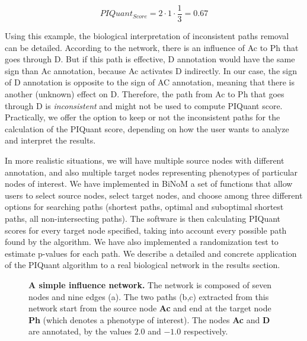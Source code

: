 \documentclass[10pt]{bmc_article}
\newenvironment{bmcformat}{\baselineskip20pt\sloppy\setboolean{publ}{false}}{\baselineskip20pt\sloppy}
\begin{document}
\begin{bmcformat}
$$
 PIQuant_{Score} = 2 \cdot 1 \cdot \frac{1}{3} = 0.67
$$

Using this example, the biological interpretation of inconsistent paths removal
can be detailed. According to the network, there is an influence of Ac to Ph
that goes through D. But if this path
is effective, D annotation would have the same sign than Ac annotation, because
Ac activates D indirectly. In our case, the sign of D annotation is opposite to
the sign of AC annotation, meaning that there is another (unknown) effect on D.
Therefore, the path from Ac to Ph that goes through D is \textit{inconsistent} and
might not be used to compute PIQuant score. Practically, we offer the option to
keep or not the inconsistent paths for the calculation of the PIQuant score,
depending on how the user wants to analyze and interpret the results.

In more realistic situations, we will have multiple source nodes with different
 annotation, and also multiple target nodes representing phenotypes of
particular nodes of interest. We have implemented in BiNoM a set of functions
that allow users to select source nodes, select target nodes, and choose among
three different options for searching paths (shortest paths, optimal and
suboptimal shortest paths, all non-intersecting paths). The software is then
calculating PIQuant scores for every target node specified, taking into account
every possible path found by the algorithm. We have also implemented a
randomization test to estimate p-values for each path. We describe a detailed
and concrete application of the PIQuant algorithm to a real biological network
in the results section.

\begin{figure}[h]
 \caption{\label{piquantnetworks}  \textbf{A simple influence network.} The 
network is composed of seven nodes and nine edges (a). The two paths (b,c)
extracted from this network start from the source node \textbf{Ac} and end at
the target node \textbf{Ph} (which denotes a phenotype of interest). The nodes
\textbf{Ac} and \textbf{D} are annotated, by the values $2.0$ and $-1.0$ respectively.}
\end{figure}


\end{bmcformat}
\end{document}
